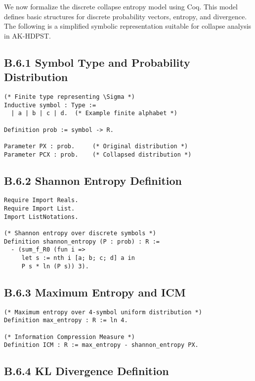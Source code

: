 \documentclass[11pt]{article}
\begin{document}
We now formalize the discrete collapse entropy model using Coq. This model defines basic structures for discrete probability vectors, entropy, and divergence. The following is a simplified symbolic representation suitable for collapse analysis in AK-HDPST.

\subsection*{B.6.1 Symbol Type and Probability Distribution}

\begin{lstlisting}
(* Finite type representing \Sigma *)
Inductive symbol : Type :=
  | a | b | c | d.  (* Example finite alphabet *)

Definition prob := symbol -> R.

Parameter PX : prob.     (* Original distribution *)
Parameter PCX : prob.    (* Collapsed distribution *)
\end{lstlisting}


\subsection*{B.6.2 Shannon Entropy Definition}

\begin{lstlisting}
Require Import Reals.
Require Import List.
Import ListNotations.

(* Shannon entropy over discrete symbols *)
Definition shannon_entropy (P : prob) : R :=
  - (sum_f_R0 (fun i =>
     let s := nth i [a; b; c; d] a in
     P s * ln (P s)) 3).
\end{lstlisting}

\subsection*{B.6.3 Maximum Entropy and ICM}

\begin{lstlisting}
(* Maximum entropy over 4-symbol uniform distribution *)
Definition max_entropy : R := ln 4.

(* Information Compression Measure *)
Definition ICM : R := max_entropy - shannon_entropy PX.
\end{lstlisting}

\subsection*{B.6.4 KL Divergence Definition}
\end{document}
